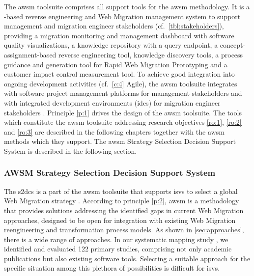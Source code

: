The \gls{awsm} toolsuite comprises all support tools for the \gls{awsm} methodology.
It is a -based reverse engineering and \gls{Web Migration} management system to support management and migration engineer stakeholders (cf.~\cref{tbl:stakeholders}), providing a migration monitoring and management dashboard with software quality visualizations, a  knowledge repository with a query endpoint, a concept-assignment-based reverse engineering tool, knowledge discovery tools, a process guidance and generation tool for \gls{Rapid Web Migration Prototyping} and a customer impact control measurement tool.
To achieve good integration into ongoing development activities (cf.~\cref{c:4} Agile), the \gls{awsm} toolsuite integrates with software project management platforms for management stakeholders and with integrated development environments (\glspl{ide}) for migration engineer stakeholders  \autocite[similar to the ARTIST Methodology Process Tool (MPT)][]{ARTIST2015ProcessFramework,Menychtas2014ARTISTJournal}.
Principle \cref{p:1} drives the design of the \gls{awsm} toolsuite.
The tools which constitute the \gls{awsm} toolsuite addressing research objectives \cref{ro:1}, \cref{ro:2} and \cref{ro:3} are described in the following chapters together with the \gls{awsm} methods which they support.
The \gls{awsm} Strategy Selection Decision Support System is described in the following section.

\hypertarget{sec:s2dcs}{%
\subsubsection*{AWSM Strategy Selection Decision Support System}\label{sec:s2dcs}}

The \gls{s2dcs} is a part of the \gls{awsm} toolsuite that supports \glspl{isv} to select a global \gls{Web Migration} strategy \autocite[cf.~\gls{remip} \emph{strategy selection} discipline][]{Sneed2010ReMiP,Gipp2007ReMiP}.
According to principle \cref{p:2}, \gls{awsm} is a methodology that provides solutions addressing the identified gaps in current \gls{Web Migration} approaches, designed to be open for integration with existing \gls{Web Migration} reengineering and transformation process models.
As shown in \cref{sec:approaches}, there is a wide range of approaches.
In our systematic mapping study \autocite{Heil2017Survey}, we identified and evaluated 122 primary studies, comprising not only academic publications but also existing software tools.
Selecting a suitable approach for the specific situation among this plethora of possibilities is difficult for \glspl{isv}.

